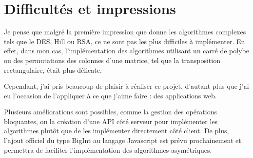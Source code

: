 \documentclass{article}
\begin{document}
\section{Difficultés et impressions}

Je pense que malgré la première impression que donne les algorithmes complexes tels que le DES, Hill ou RSA, ce ne sont pas les plus difficiles à implémenter. En effet, dans mon cas, l'implémentation des algorithmes utilisant un carré de polybe ou des permutations des colonnes d'une matrice, tel que la transposition rectangulaire, était plus délicate. 

Cependant, j'ai pris beaucoup de plaisir à réaliser ce projet, d'autant plus que j'ai eu l'occasion de l'appliquer à ce que j'aime faire : des applications web. 

Plusieurs améliorations sont possibles, comme la gestion des opérations bloquantes, ou la création d'une API côté serveur pour implémenter les algorithmes plutôt que de les implémenter directement côté client. De plus, l'ajout officiel du type BigInt au langage Javascript est prévu prochainement et permettra de faciliter l'implémentation des algorithmes asymétriques.



\end{document}
